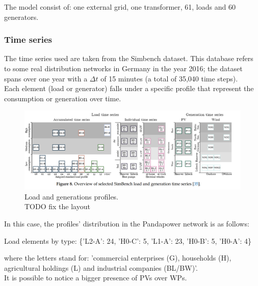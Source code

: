 The model consist of: one external grid, one transformer, 61, loads and 60 generators.

\subsubsection{Time series}
The time series used are taken from the Simbench dataset. This database refers to some real distribution networks in Germany in the year 2016; the dataset spans over one year with a $\Delta t$ of 15 minutes (a total of 35,040 time steps).\\

Each element (load or generator) falls under a specific profile that represent the consumption or generation over time.

\begin{figure}[h]
\centering
    \includegraphics[width=.9\linewidth]{images/MVOberr/Simbench.PNG}
\caption{Load and generations profiles. \\
TODO fix the layout}
\label{fig:gym_anm_net}
\end{figure}

In this case, the profiles' distribution in the Pandapower network is as follows:

\begin{algorithm}[h]
\State Load elements by type: \{'L2-A': 24, 'H0-C': 5, 'L1-A': 23, 'H0-B': 5, 'H0-A': 4\}

\end{algorithm}
\noindent where the letters stand for: 'commercial enterprises (G), households (H), agricultural holdings (L) and industrial companies (BL/BW)'. \\
It is possible to notice a bigger presence of PVs over WPs.

